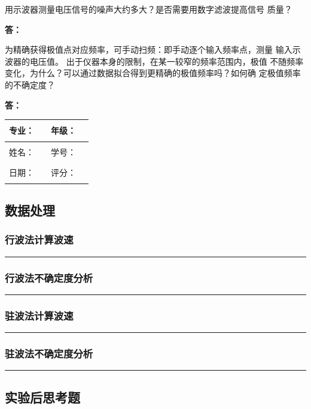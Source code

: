 \documentclass[dvipsnames, svgnames,a4paper,11pt]{article}
\newcommand{\answerblank}[1][3.8cm]{%
  \par\nopagebreak[4]\noindent\textbf{答：}\par\nopagebreak[4]\vspace*{#1}}
\newcommand{\recordblank}[1]{%
  \par\noindent\rule{0.95\linewidth}{0pt}\rule{0pt}{#1}\par}
\begin{document}
\begin{question}
用示波器测量电压信号的噪声大约多大？是否需要用数字滤波提高信号
质量？
\end{question}
\answerblank[3.8cm]

\begin{question}
为精确获得极值点对应频率，可手动扫频：即手动逐个输入频率点，测量
输入示波器的电压值。 出于仪器本身的限制，在某一较窄的频率范围内，极值
不随频率变化，为什么？可以通过数据拟合得到更精确的极值频率吗？如何确
定极值频率的不确定度？
\end{question}
\answerblank[3.8cm]

\clearpage
\begin{table}
	\renewcommand\arraystretch{1.7}
	\begin{tabularx}{\textwidth}{|X|X|X|X|}
	\hline
	专业：& \rule{2.5cm}{0.4pt} & 年级：& \rule{2.5cm}{0.4pt}\\
	\hline
	姓名：& \rule{2.5cm}{0.4pt} & 学号：& \rule{3cm}{0.4pt}\\
	\hline
	日期：& \rule{3cm}{0.4pt} & 评分：& \rule{3cm}{0.4pt}\\
	\hline
	\end{tabularx}
\end{table}

\subsection{数据处理}
\subsubsection{行波法计算波速}
\recordblank{3.2cm}
\subsubsection{行波法不确定度分析}
\recordblank{3.2cm}
\subsubsection{驻波法计算波速}
\recordblank{3.2cm}
\subsubsection{驻波法不确定度分析}
\recordblank{3.2cm}
\subsection{实验后思考题}
\end{document}
